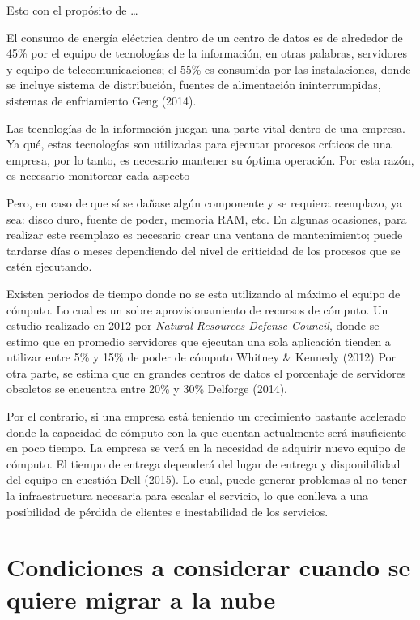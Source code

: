 \documentclass[12pt,twoside]{reedthesis}
\begin{document}
Esto con el propósito de \ldots{}

El consumo de energía eléctrica dentro de un centro de datos es de alrededor de 45\% por el equipo de tecnologías de la información, en otras palabras, servidores y equipo de telecomunicaciones; el 55\% es consumida por las instalaciones, donde se incluye sistema de distribución, fuentes de alimentación ininterrumpidas, sistemas de enfriamiento Geng (2014).

Las tecnologías de la información juegan una parte vital dentro de una empresa. Ya qué, estas tecnologías son utilizadas para ejecutar procesos críticos de una empresa, por lo tanto, es necesario mantener su óptima operación.
Por esta razón, es necesario monitorear cada aspecto

Pero, en caso de que sí se dañase algún componente y se requiera reemplazo, ya sea: disco duro, fuente de poder, memoria RAM, etc. En algunas ocasiones, para realizar este reemplazo es necesario crear una ventana de mantenimiento; puede tardarse días o meses dependiendo del nivel de criticidad de los procesos que se estén ejecutando.

Existen periodos de tiempo donde no se esta utilizando al máximo el equipo de cómputo. Lo cual es un sobre aprovisionamiento de recursos de cómputo. Un estudio realizado en 2012 por \emph{Natural Resources Defense Council}, donde se estimo que en promedio servidores que ejecutan una sola aplicación tienden a utilizar entre 5\% y 15\% de poder de cómputo Whitney \& Kennedy (2012)
Por otra parte, se estima que en grandes centros de datos el porcentaje de servidores obsoletos se encuentra entre 20\% y 30\% Delforge (2014).

Por el contrario, si una empresa está teniendo un crecimiento bastante acelerado donde la capacidad de cómputo con la que cuentan actualmente será insuficiente en poco tiempo. La empresa se verá en la necesidad de adquirir nuevo equipo de cómputo. El tiempo de entrega dependerá del lugar de entrega y disponibilidad del equipo en cuestión Dell (2015). Lo cual, puede generar problemas al no tener la infraestructura necesaria para escalar el servicio, lo que conlleva a una posibilidad de pérdida de clientes e inestabilidad de los servicios.

\hypertarget{condiciones-a-considerar-cuando-se-quiere-migrar-a-la-nube}{%
\section{Condiciones a considerar cuando se quiere migrar a la nube}\label{condiciones-a-considerar-cuando-se-quiere-migrar-a-la-nube}}
\end{document}
